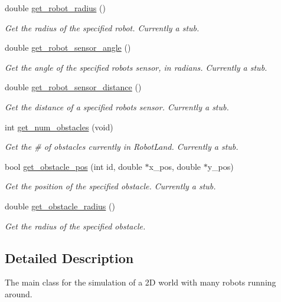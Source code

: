 \begin{DoxyCompactItemize}
double \hyperlink{classrobot__land_a874897fdbb0d4bf54cd70226d3515bdd}{get\+\_\+robot\+\_\+radius} ()
\begin{DoxyCompactList}\small\item\em Get the radius of the specified robot. Currently a stub. \end{DoxyCompactList}\item 
double \hyperlink{classrobot__land_a9f874d4ea9cb32801af60413753a39f7}{get\+\_\+robot\+\_\+sensor\+\_\+angle} ()
\begin{DoxyCompactList}\small\item\em Get the angle of the specified robots sensor, in radians. Currently a stub. \end{DoxyCompactList}\item 
double \hyperlink{classrobot__land_a4bef892a1b2c7c6a539dfed5fd2abae5}{get\+\_\+robot\+\_\+sensor\+\_\+distance} ()
\begin{DoxyCompactList}\small\item\em Get the distance of a specified robot\textquotesingle{}s sensor. Currently a stub. \end{DoxyCompactList}\item 
int \hyperlink{classrobot__land_ab6edf762a971b54341c1d0740c2c431d}{get\+\_\+num\+\_\+obstacles} (void)
\begin{DoxyCompactList}\small\item\em Get the \# of obstacles currently in Robot\+Land. Currently a stub. \end{DoxyCompactList}\item 
bool \hyperlink{classrobot__land_ab9f49e83909a16ecc0aeae8f6fa6f673}{get\+\_\+obstacle\+\_\+pos} (int id, double $\ast$x\+\_\+pos, double $\ast$y\+\_\+pos)
\begin{DoxyCompactList}\small\item\em Get the position of the specified obstacle. Currently a stub. \end{DoxyCompactList}\item 
double \hyperlink{classrobot__land_aefbde3fcc92d17c9a048f496f2cd7454}{get\+\_\+obstacle\+\_\+radius} ()
\begin{DoxyCompactList}\small\item\em Get the radius of the specified obstacle. \end{DoxyCompactList}\end{DoxyCompactItemize}


\subsection{Detailed Description}
The main class for the simulation of a 2D world with many robots running around. 

